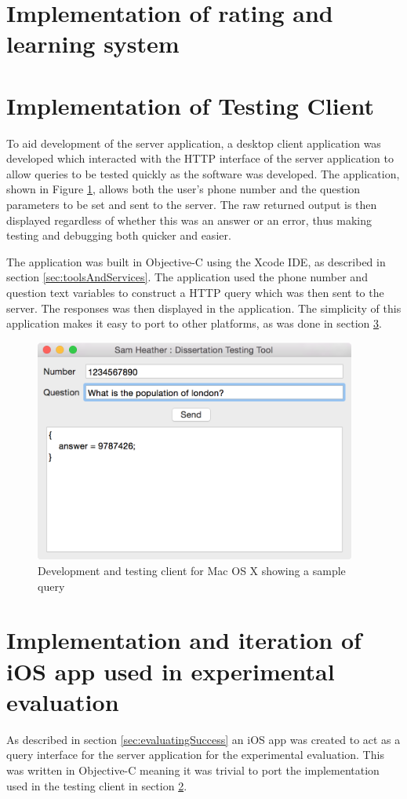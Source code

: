 \documentclass[authoryearcitations]{UoYCSproject}
\begin{document}
\section{Implementation of rating and learning system}

\section{Implementation of Testing Client}
\label{sec:implementationTestingClient}
To aid development of the server application, a desktop client application was developed which interacted with the HTTP interface of the server application to allow queries to be tested quickly as the software was developed. The application, shown in Figure \ref{fig:devClient}, allows both the user's phone number and the question parameters to be set and sent to the server. The raw returned output is then displayed regardless of whether this was an answer or an error, thus making testing and debugging both quicker and easier. 

The application was built in Objective-C using the Xcode IDE, as described in section \ref{sec:toolsAndServices}. The application used the phone number and question text variables to construct a HTTP query which was then sent to the server. The responses was then displayed in the application. The simplicity of this application makes it easy to port to other platforms, as was done in section \ref{sec:implementationExperimentClient}.

\begin{figure}[htb]
    \centering
    \includegraphics[width=300pt]{devClient}
    \caption{Development and testing client for Mac OS X showing a sample query}
    \label{fig:devClient}
\end{figure}

\section{Implementation and iteration of iOS app used in experimental evaluation}
\label{sec:implementationExperimentClient}
As described in section \ref{sec:evaluatingSuccess} an iOS app was created to act as a query interface for the server application for the experimental evaluation. This was written in Objective-C meaning it was trivial to port the implementation used in the testing client in section \ref{sec:implementationTestingClient}.
\end{document}
